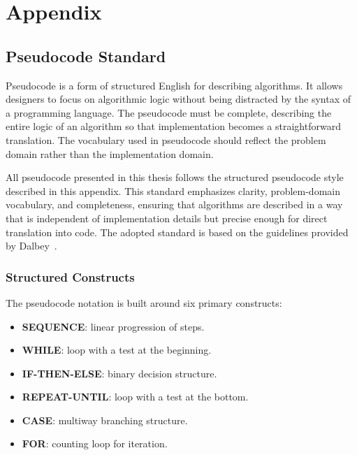 
\chapter*{Appendix} %

\label{AppendixX} %

\section{Pseudocode Standard}
\label{appendix:pseudocode-standard}

\quad  Pseudocode is a form of structured English for describing algorithms. It allows designers to focus on algorithmic logic without being distracted by the syntax of a programming language. The pseudocode must be complete, describing the entire logic of an algorithm so that implementation becomes a straightforward translation. The vocabulary used in pseudocode should reflect the problem domain rather than the implementation domain.  

\quad All pseudocode presented in this thesis follows the structured pseudocode style described in this appendix. This standard emphasizes clarity, problem-domain vocabulary, and completeness, ensuring that algorithms are described in a way that is independent of implementation details but precise enough for direct translation into code. The adopted standard is based on the guidelines provided by Dalbey~\cite{dalbey2003pseudocode}.


\subsection{Structured Constructs}
The pseudocode notation is built around six primary constructs:  
\begin{itemize}
	\item \textbf{SEQUENCE}: linear progression of steps.  
	\item \textbf{WHILE}: loop with a test at the beginning.  
	\item \textbf{IF-THEN-ELSE}: binary decision structure.  
	\item \textbf{REPEAT-UNTIL}: loop with a test at the bottom.  
	\item \textbf{CASE}: multiway branching structure.  
	\item \textbf{FOR}: counting loop for iteration.  
\end{itemize}

